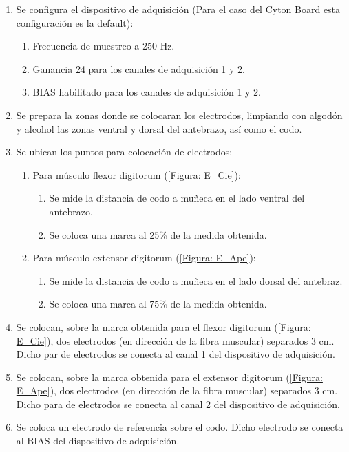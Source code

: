 \begin{enumerate}
	\item Se configura el dispositivo de adquisición (Para el caso del Cyton Board esta configuración es la default):
	\begin{enumerate}
		\item Frecuencia de muestreo a 250 Hz.
		\item Ganancia 24 para los canales de adquisición 1 y 2.
		\item BIAS habilitado para los canales de adquisición 1 y 2.
	\end{enumerate}
	\item Se prepara la zonas donde se colocaran los electrodos, limpiando con algodón y alcohol las zonas ventral y dorsal del antebrazo, así como el codo.
	\item Se ubican los puntos para colocación de electrodos:
	\begin{enumerate}
		\item Para músculo flexor digitorum (\ref{Figura: E_Cie}):
		\begin{enumerate}
			\item Se mide la distancia de codo a muñeca en el lado ventral del antebrazo.
			\item Se coloca una marca al 25\% de la medida obtenida.
		\end{enumerate}
		\item Para músculo extensor digitorum (\ref{Figura: E_Ape}):
		\begin{enumerate}
			\item Se mide la distancia de codo a muñeca en el lado dorsal del antebraz.
			\item Se coloca una marca al 75\% de la medida obtenida.
		\end{enumerate}
	\end{enumerate}
	\item Se colocan, sobre la marca obtenida para el flexor digitorum (\ref{Figura: E_Cie}), dos electrodos (en dirección de la fibra muscular) separados 3 cm. Dicho par de electrodos se conecta al canal 1 del dispositivo de adquisición.
	\item Se colocan, sobre la marca obtenida para el extensor digitorum (\ref{Figura: E_Ape}), dos electrodos (en dirección de la fibra muscular) separados 3 cm. Dicho para de electrodos se conecta al canal 2 del dispositivo de adquisición.
	\item Se coloca un electrodo de referencia sobre el codo. Dicho electrodo se conecta al BIAS del dispositivo de adquisición.
\end{enumerate}

